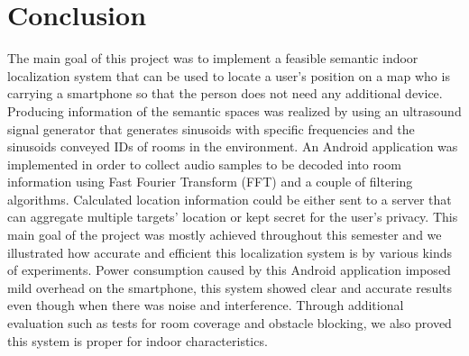 \section{Conclusion}
\label{sec:conclusion}

The main goal of this project was to implement a feasible semantic indoor localization system that can be used to locate a user's position on a map who is carrying a smartphone so that the person does not need any additional device. Producing information of the semantic spaces was realized by using an ultrasound signal generator that generates sinusoids with specific frequencies and the sinusoids conveyed IDs of rooms in the environment. An Android application was implemented in order to collect audio samples to be decoded into room information using Fast Fourier Transform (FFT) and a couple of filtering algorithms. Calculated location information could be either sent to a server that can aggregate multiple targets' location or kept secret for the user's privacy. This main goal of the project was mostly achieved throughout this semester and we illustrated how accurate and efficient this localization system is by various kinds of experiments. Power consumption caused by this Android application imposed mild overhead on the smartphone, this system showed clear and accurate results even though when there was noise and interference. Through additional evaluation such as tests for room coverage and obstacle blocking, we also proved this system is proper for indoor characteristics. 

